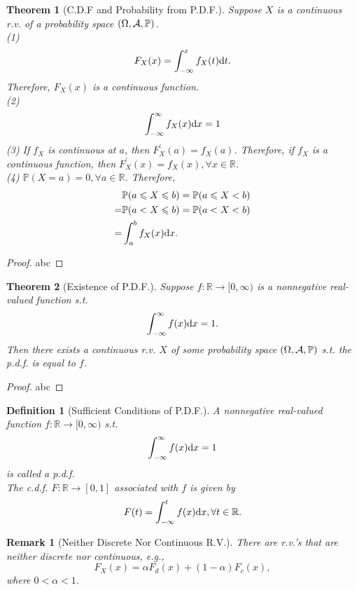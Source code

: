 \documentclass[openany,12pt]{book}
\newtheorem{theorem}{Theorem}[chapter]
\newtheorem{remark}{Remark}[chapter]
\newtheorem{definition}{Definition}[chapter]
\begin{document}
\begin{theorem}[C.D.F and Probability from P.D.F.]
  Suppose $X$ is a continuous r.v. of a probability space $(\Omega,\mathcal{A},\mathbb{P})$.\\
  (1)
  $$
    F_X(x)=\int_{-\infty}^{x}{f_X(t)\mathrm{d} t}.
  $$
  Therefore, $F_X(x)$ is a continuous function.\\
  (2)
  $$
    \int_{-\infty}^{\infty}{f_X(x)\mathrm{d} x}=1
  $$
  (3) If $f_X$ is continuous at $a$, then $F_X^\prime(a)=f_X(a)$. Therefore, if $f_X$ is a continuous function, then $F_X^\prime(x)=f_X(x), \forall x\in\mathbb{R}$.\\
  (4) $\mathbb{P}(X=a)=0,\forall a\in\mathbb{R}$. Therefore,
  $$\begin{aligned}
        & \mathbb{P}(a\leqslant X\leqslant b)=\mathbb{P}(a\leqslant X<b) \\
      = & \mathbb{P}(a<X\leqslant b)=\mathbb{P}(a<X<b)       \\
      = & \int_{a}^{b}{f_X(x)\mathrm{d} x}.
    \end{aligned}
  $$
\end{theorem}

\begin{proof}
  abc
\end{proof}

\begin{theorem}[Existence of P.D.F.]
  Suppose $f: \mathbb{R}\to[0,\infty)$ is a nonnegative real-valued function s.t.
  $$
    \int_{-\infty}^{\infty}{f(x)\mathrm{d} x}=1.
  $$
  Then there exists a continuous r.v. $X$ of some probability space $(\Omega,\mathcal{A},\mathbb{P})$ s.t. the p.d.f. is equal to $f$.
\end{theorem}

\begin{proof}
  abc
\end{proof}

\begin{definition}[Sufficient Conditions of P.D.F.]
  A nonnegative real-valued function $f: \mathbb{R}\to[0,\infty)$ s.t.
  $$
    \int_{-\infty}^{\infty}{f(x)\mathrm{d} x}=1
  $$
  is called a p.d.f. \\
  The c.d.f. $F: \mathbb{R}\to[0,1]$ associated with $f$ is given by
  $$
    F(t)=\int_{-\infty}^{t}{f(x)\mathrm{d} x},\forall t\in\mathbb{R}.
  $$
\end{definition}

\begin{remark}[Neither Discrete Nor Continuous R.V.]
  There are r.v.'s that are neither discrete nor continuous, e.g., $$F_X(x)=\alpha F_d(x)+(1-\alpha)F_c(x),$$
  where $0<\alpha<1$.
\end{remark}
\end{document}

